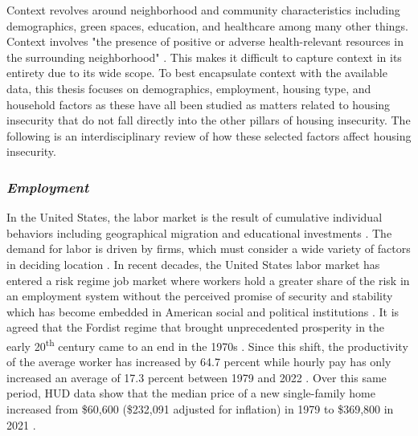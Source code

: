 
Context revolves around neighborhood and community characteristics including demographics, green spaces, education, and healthcare among many other things. Context involves "the presence of positive or adverse health-relevant resources in the surrounding neighborhood" \citep[9]{swope_housing_2020}. This makes it difficult to capture context in its entirety due to its wide scope. To best encapsulate context with the available data, this thesis focuses on demographics, employment, housing type, and household factors as these have all been studied as matters related to housing insecurity that do not fall directly into the other pillars of housing insecurity. The following is an interdisciplinary review of how these selected factors affect housing insecurity.  

 

\subsubsection{\textit{Employment}} 

 

In the United States, the labor market is the result of cumulative individual behaviors including geographical migration and educational investments \citep{wiener_labor_2020}. The demand for labor is driven by firms, which must consider a wide variety of factors in deciding location \citep{partridge_persistent_2007}. In recent decades, the United States labor market has entered a risk regime job market where workers hold a greater share of the risk in an employment system without the perceived promise of security and stability which has become embedded in American social and political institutions \citep{lowe_perceived_2018}. It is agreed that the Fordist regime that brought unprecedented prosperity in the early 20\textsuperscript{th} century came to an end in the 1970s \citep{stockhammer_stylized_2008}. Since this shift, the productivity of the average worker has increased by 64.7 percent while hourly pay has only increased an average of 17.3 percent between 1979 and 2022 \citep{economic_policy_institute_productivity-pay_2022}. Over this same period, HUD data show that the median price of a new single-family home increased from \$60,600 (\$232,091 adjusted for inflation) in 1979 to \$369,800 in 2021 \citep{us_census_bureau_median_2023}. %

